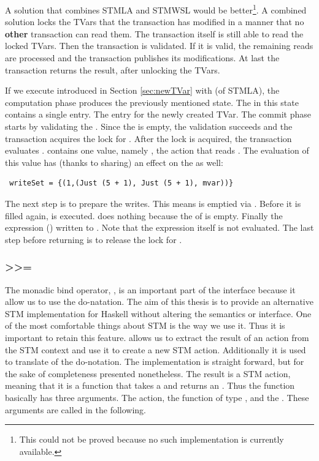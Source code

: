 A solution that combines STMLA and STMWSL would be better\footnote{This could 
not be proved because no such implementation is currently available.}.
A combined solution locks the TVars that the transaction has modified in a 
manner that no \textbf{other} transaction can read them. The transaction itself
is still able to read the locked TVars. Then the transaction is validated. 
If it is valid, the remaining reads are processed and the transaction publishes
its modifications. At last the transaction returns the result, after unlocking
the TVars.

If we execute  introduced in Section \ref{sec:newTVar} with 
 (of STMLA), the computation phase produces the previously mentioned state.
The  in this state contains a single entry. The entry for the
newly created TVar. The commit phase starts by validating the . 
Since the  is empty, the validation succeeds and the transaction
acquires the lock for . After the lock is acquired, the transaction 
evaluates .  contains one value, namely ,
the  action that reads . The evaluation of this value 
has (thanks to sharing) an effect on the  as well:
\begin{lstlisting}
 writeSet = {(1,(Just (5 + 1), Just (5 + 1), mvar))} 
\end{lstlisting}
The next step is to prepare the writes. This means  is emptied via 
. Before it is filled again,  is executed. 
does nothing because the  of  is empty. Finally the expression ()
written to . Note that the expression itself is not evaluated. The last step
before returning \code{()} is to release the lock for .

\subsubsection{>>=}
The monadic bind operator, \code{>>=}, is an important part of the interface because it allow us 
to use the do-natation. The aim of this thesis is to provide an alternative STM 
implementation for Haskell without altering the semantics or interface. One of 
the most comfortable things about STM is the way we use it. Thus it is important to 
retain this feature.  allows us to 
extract the result of an  action from the STM context and use it to create 
a new STM action. Additionally it is used to translate \code{<-} of the do-notation.
The implementation is straight forward, but for the sake of completeness presented
nonetheless. The result is a STM action, meaning that it is a function that takes 
a  and returns an . Thus the function \code{>>=} basically
has three arguments. The  action, the function of type ,
and the . These arguments are called 
in the following. 

